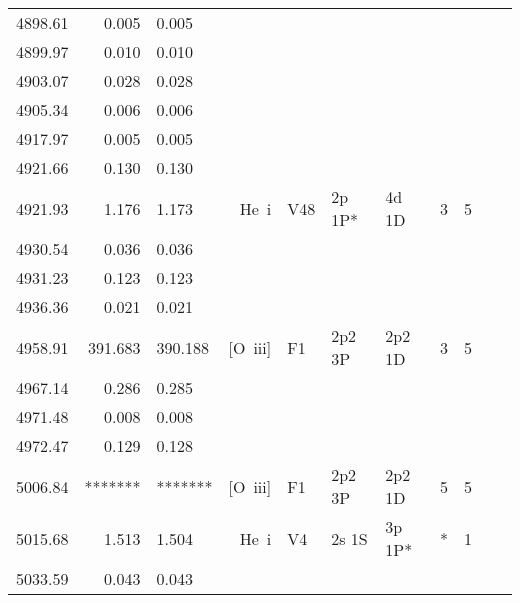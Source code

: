 \begin{longtable}{lrlrlllllll}
 4898.61 &   0.005 &   0.005                                                                                      \\
 4899.97 &   0.010 &   0.010                                                                                      \\
 4903.07 &   0.028 &   0.028                                                                                      \\
 4905.34 &   0.006 &   0.006                                                                                      \\
 4917.97 &   0.005 &   0.005                                                                                      \\
 4921.66 &   0.130 &   0.130                                                                                      \\
 4921.93 &   1.176 &   1.173 &  He~{\sc i}      &  V48       &  2p 1P*    &  4d 1D     &          3 &        5    \\
 4930.54 &   0.036 &   0.036                                                                                      \\
 4931.23 &   0.123 &   0.123                                                                                      \\
 4936.36 &   0.021 &   0.021                                                                                      \\
 4958.91 & 391.683 & 390.188 &  [O~{\sc iii}]   &  F1        &  2p2 3P    &  2p2 1D    &          3 &        5    \\
 4967.14 &   0.286 &   0.285                                                                                      \\
 4971.48 &   0.008 &   0.008                                                                                      \\
 4972.47 &   0.129 &   0.128                                                                                      \\
 5006.84 & ******* & ******* &  [O~{\sc iii}]   &  F1        &  2p2 3P    &  2p2 1D    &          5 &        5    \\
 5015.68 &   1.513 &   1.504 &  He~{\sc i}      &  V4        &  2s 1S     &  3p 1P*    &          * &        1    \\
 5033.59 &   0.043 &   0.043                                                                                      \\

\end{longtable}
